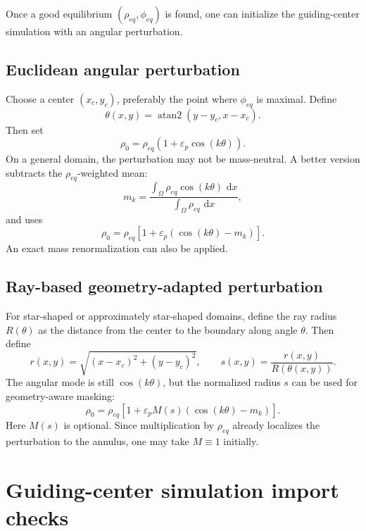 \documentclass[11pt,a4paper]{article}
\newcommand{\Om}{\Omega}
\newcommand{\dd}{\,\mathrm{d}}
\newcommand{\eps}{\varepsilon}
\begin{document}
Once a good equilibrium $(\rho_{eq},\phi_{eq})$ is found, one can initialize the guiding-center simulation with an angular perturbation.

\subsection{Euclidean angular perturbation}

Choose a center $(x_c,y_c)$, preferably the point where $\phi_{eq}$ is maximal. Define
\begin{equation}
  \theta(x,y)=\operatorname{atan2}(y-y_c,x-x_c).
\end{equation}
Then set
\begin{equation}
  \rho_0=\rho_{eq}\left(1+\eps_p\cos(k\theta)\right).
\end{equation}
On a general domain, the perturbation may not be mass-neutral. A better version subtracts the $\rho_{eq}$-weighted mean:
\begin{equation}
  m_k=\frac{\int_\Om \rho_{eq}\cos(k\theta)\,\dd x}{\int_\Om\rho_{eq}\,\dd x},
\end{equation}
and uses
\begin{equation}
  \rho_0=\rho_{eq}\left[1+\eps_p(\cos(k\theta)-m_k)\right].
\end{equation}
An exact mass renormalization can also be applied.

\subsection{Ray-based geometry-adapted perturbation}

For star-shaped or approximately star-shaped domains, define the ray radius $R(\theta)$ as the distance from the center to the boundary along angle $\theta$. Then define
\begin{equation}
  r(x,y)=\sqrt{(x-x_c)^2+(y-y_c)^2},
  \qquad
  s(x,y)=\frac{r(x,y)}{R(\theta(x,y))}.
\end{equation}
The angular mode is still $\cos(k\theta)$, but the normalized radius $s$ can be used for geometry-aware masking:
\begin{equation}
  \rho_0=\rho_{eq}\left[1+\eps_p M(s)(\cos(k\theta)-m_k)\right].
\end{equation}
Here $M(s)$ is optional. Since multiplication by $\rho_{eq}$ already localizes the perturbation to the annulus, one may take $M\equiv1$ initially.

\section{Guiding-center simulation import checks}
\end{document}

